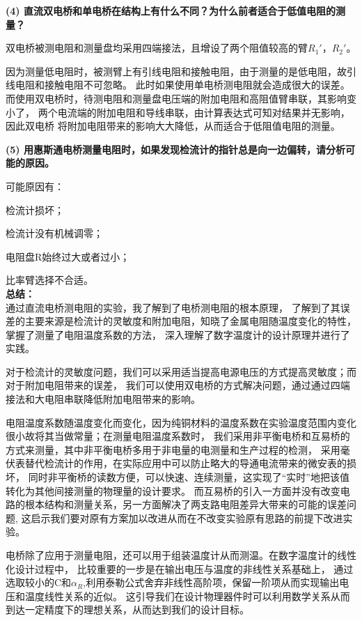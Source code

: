 \documentclass[UTF8]{ctexart}
\begin{document}
\noindent  \textbf{(4) 直流双电桥和单电桥在结构上有什么不同？为什么前者适合于低值电阻的测量？}

双电桥被测电阻和测量盘均采用四端接法，且增设了两个阻值较高的臂$R_1'$，$R_2'$。

因为测量低电阻时，被测臂上有引线电阻和接触电阻，由于测量的是低电阻，故引线电阻和接触电阻不可忽略。
此时如果使用单电桥测电阻就会造成很大的误差。
而使用双电桥时，待测电阻和测量盘电压端的附加电阻和高阻值臂串联，其影响变小了，
两个电流端的附加电阻和导线串联，由计算表达式可知对结果并无影响，因此双电桥
将附加电阻带来的影响大大降低，从而适合于低阻值电阻的测量。



\noindent  \textbf{(5) 用惠斯通电桥测量电阻时，如果发现检流计的指针总是向一边偏转，请分析可能的原因。}

可能原因有：

检流计损坏；

检流计没有机械调零；

电阻盘R始终过大或者过小；

比率臂选择不合适。\\

\noindent  \textbf{总结：}\\

通过直流电桥测电阻的实验，我了解到了电桥测电阻的根本原理，
了解到了其误差的主要来源是检流计的灵敏度和附加电阻，知晓了金属电阻随温度变化的特性，掌握了测量了电阻温度系数的方法，
深入理解了数字温度计的设计原理并进行了实践。

对于检流计的灵敏度问题，我们可以采用适当提高电源电压的方式提高灵敏度；而对于附加电阻带来的误差，
我们可以使用双电桥的方式解决问题，通过通过四端接法和大电阻串联降低附加电阻带来的影响。

电阻温度系数随温度变化而变化，因为纯铜材料的温度系数在实验温度范围内变化很小故将其当做常量；在测量电阻温度系数时，
我们采用非平衡电桥和互易桥的方式来测量，其中非平衡电桥多用于非电量的电测量和生产过程的检测，
采用毫伏表替代检流计的作用，在实际应用中可以防止略大的导通电流带来的微安表的损坏，
同时非平衡桥的读数方便，可以快速、连续测量，这实现了“实时”地把该值转化为其他间接测量的物理量的设计要求。
而互易桥的引入一方面并没有改变电路的根本结构和测量关系，另一方面解决了两支路电阻差异大带来的可能的误差问题,
这启示我们要对原有方案加以改进从而在不改变实验原有思路的前提下改进实验。

电桥除了应用于测量电阻，还可以用于组装温度计从而测温。在数字温度计的线性化设计过程中，
比较重要的一步是在输出电压与温度的非线性关系基础上，
通过选取较小的C和$\alpha_R$,利用泰勒公式舍弃非线性高阶项，保留一阶项从而实现输出电压和温度线性关系的近似。
这引导我们在设计物理器件时可以利用数学关系从而到达一定精度下的理想关系，从而达到我们的设计目标。
\\
\\
\end{document}
